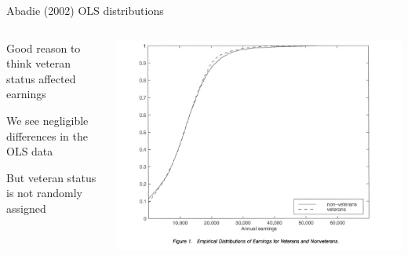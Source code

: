 \documentclass[notes,11pt, aspectratio=169]{beamer}
\newenvironment{wideitemize}{\itemize\addtolength{\itemsep}{10pt}}{\enditemize}
\begin{document}
\begin{frame}{Abadie (2002) OLS distributions}
  \begin{columns}[T] %
    \begin{column}{0.3\textwidth}
      \begin{wideitemize}
      \item Good reason to think veteran status affected earnings
      \item We see negligible differences in the OLS data
      \item But veteran status is not randomly assigned
      \end{wideitemize}
\end{column}
\begin{column}{0.7\textwidth}
  \begin{center}
    \includegraphics[width=\linewidth]{images/abadie_kappa1.png}
  \end{center}
\end{column}
\end{columns}
\end{frame}
\end{document}
